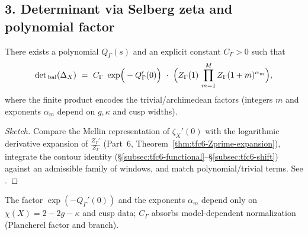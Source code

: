 \subsection*{3. Determinant via Selberg zeta and polynomial factor}\relax\hspace{0pt}
\label{subsec:tfc7-Selberg}\relax\hspace{0pt}

\begin{theorem}\relax\hspace{0pt}
\label{thm:tfc7-det-selberg}\relax\hspace{0pt}
There exists a polynomial $Q_\Gamma(s)$ and an explicit constant $C_\Gamma>0$ such that
\begin{equation}\relax\hspace{0pt}
\label{eq:tfc7-selberg-det}\relax\hspace{0pt}
\det{}_{\mathrm{bal}}(\Delta_X)\ =\ C_\Gamma\ \exp\!\Big(-Q_\Gamma'(0)\Big)\ \cdot\ \Big(Z_\Gamma(1)\,\prod_{m=1}^{M} Z_\Gamma(1+m)^{\alpha_m}\Big),
\end{equation}
where the finite product encodes the trivial/archimedean factors (integers $m$ and exponents $\alpha_m$ depend on $g,\kappa$ and cusp widths). \relax\hspace{0pt}
\end{theorem}

\begin{proof}[Sketch]\relax\hspace{0pt}
Compare the Mellin representation of $\zeta_X'(0)$ with the logarithmic derivative expansion of $\frac{Z_\Gamma'}{Z_\Gamma}$ (Part~6, Theorem~\ref{thm:tfc6-Zprime-expansion}), integrate the contour identity (\S\ref{subsec:tfc6-functional}--\S\ref{subsec:tfc6-shift}) against an admissible family of windows, and match polynomial/trivial terms. See \cite{HejhalII,Muller,Borthwick}. \relax\hspace{0pt}
\end{proof}

\begin{remark}\relax\hspace{0pt}
\label{rem:tfc7-topology}\relax\hspace{0pt}
The factor $\exp(-Q_\Gamma'(0))$ and the exponents $\alpha_m$ depend only on $\chi(X)=2-2g-\kappa$ and cusp data; $C_\Gamma$ absorbs model-dependent normalization (Plancherel factor and branch). \relax\hspace{0pt}
\end{remark}

